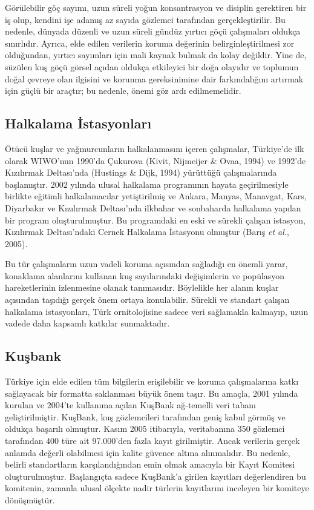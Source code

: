 \documentclass[
  a4paper,
  DIV=11,
  numbers=noendperiod]{scrreprt}
\begin{document}
Görülebilir göç sayımı, uzun süreli yoğun konsantrasyon ve disiplin
gerektiren bir iş olup, kendini işe adamış az sayıda gözlemci tarafından
gerçekleştirilir. Bu nedenle, dünyada düzenli ve uzun süreli gündüz
yırtıcı göçü çalışmaları oldukça sınırlıdır. Ayrıca, elde edilen
verilerin koruma değerinin belirginleştirilmesi zor olduğundan, yırtıcı
sayımları için mali kaynak bulmak da kolay değildir. Yine de, süzülen
kuş göçü görsel açıdan oldukça etkileyici bir doğa olayıdır ve toplumun
doğal çevreye olan ilgisini ve korunma gereksinimine dair farkındalığını
artırmak için güçlü bir araçtır; bu nedenle, önemi göz ardı
edilmemelidir.

\subsection*{Halkalama İstasyonları}\label{halkalama-istasyonlarux131}

Ötücü kuşlar ve yağmurcunların halkalanmasını içeren çalışmalar,
Türkiye'de ilk olarak WIWO'nun 1990'da Çukurova (Kivit, Nijmeijer \&
Ovaa, 1994) ve 1992'de Kızılırmak Deltası'nda (Hustings \& Dijk, 1994)
yürüttüğü çalışmalarında başlamıştır. 2002 yılında ulusal halkalama
programının hayata geçirilmesiyle birlikte eğitimli halkalamacılar
yetiştirilmiş ve Ankara, Manyas, Manavgat, Kars, Diyarbakır ve
Kızılırmak Deltası'nda ilkbahar ve sonbaharda halkalama yapılan bir
program oluşturulmuştur. Bu programdaki en eski ve sürekli çalışan
istasyon, Kızılırmak Deltası'ndaki Cernek Halkalama İstasyonu olmuştur
(Barış \emph{et al.}, 2005).

Bu tür çalışmaların uzun vadeli koruma açısından sağladığı en önemli
yarar, konaklama alanlarını kullanan kuş sayılarındaki değişimlerin ve
popülasyon hareketlerinin izlenmesine olanak tanımasıdır. Böylelikle her
alanın kuşlar açısından taşıdığı gerçek önem ortaya konulabilir. Sürekli
ve standart çalışan halkalama istasyonları, Türk ornitolojisine sadece
veri sağlamakla kalmayıp, uzun vadede daha kapsamlı katkılar
sunmaktadır.

\subsection*{Kuşbank}\label{kuux15fbank-1}

Türkiye için elde edilen tüm bilgilerin erişilebilir ve koruma
çalışmalarına katkı sağlayacak bir formatta saklanması büyük önem taşır.
Bu amaçla, 2001 yılında kurulan ve 2004'te kullanıma açılan KuşBank
ağ-temelli veri tabanı geliştirilmiştir. KuşBank, kuş gözlemcileri
tarafından geniş kabul görmüş ve oldukça başarılı olmuştur. Kasım 2005
itibarıyla, veritabanına 350 gözlemci tarafından 400 türe ait 97.000'den
fazla kayıt girilmiştir. Ancak verilerin gerçek anlamda değerli
olabilmesi için kalite güvence altına alınmalıdır. Bu nedenle, belirli
standartların karşılandığından emin olmak amacıyla bir Kayıt Komitesi
oluşturulmuştur. Başlangıçta sadece KuşBank'a girilen kayıtları
değerlendiren bu komitenin, zamanla ulusal ölçekte nadir türlerin
kayıtlarını inceleyen bir komiteye dönüşmüştür.
\end{document}
